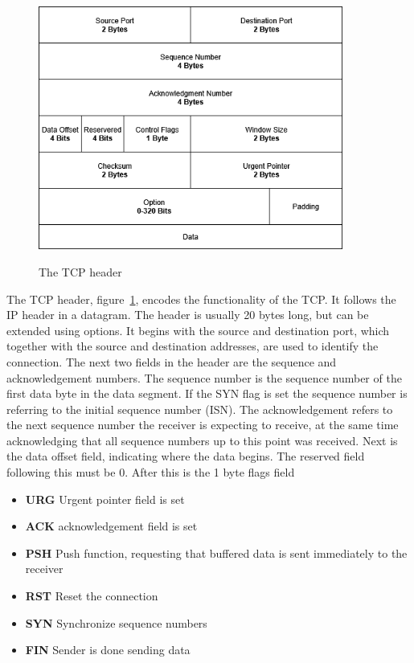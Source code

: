 \documentclass[english, 12pt, a4paper, elec, utf8, a-2b, online]{aaltothesis}
\begin{document}
\begin{figure}[t]
	\centering
	\includegraphics[alt={A block diagram of the TCP header format, detailing its fields and their sizes.}, height=8cm]{./images/tcp_header.png}
	\caption{The TCP header}
	\label{fig:tcp_header}
\end{figure}
The TCP header, figure~\ref{fig:tcp_header}, encodes the functionality of the TCP.
It follows the IP header in a datagram. The header is usually 20 bytes long, but
can be extended using options. It begins with the source and destination port, which
together with the source and destination addresses, are used to identify the connection.
The next two fields in the header are the sequence and acknowledgement numbers. The
sequence number is the sequence number of the first data byte in the data segment.
If the SYN flag is set the sequence number is referring to the initial sequence number
(ISN). The acknowledgement refers to the next sequence number the receiver is
expecting to receive, at the same time acknowledging that all sequence numbers
up to this point was received. Next is the data offset field, indicating where
the data begins. The reserved field following this must be 0. After this is the
1 byte flags field
\begin{itemize}
	\item \textbf{URG} Urgent pointer field is set
	\item \textbf{ACK} acknowledgement field is set
	\item \textbf{PSH} Push function, requesting that buffered data is sent immediately to the receiver
	\item \textbf{RST} Reset the connection
	\item \textbf{SYN} Synchronize sequence numbers
	\item \textbf{FIN} Sender is done sending data
\end{itemize}
\end{document}
